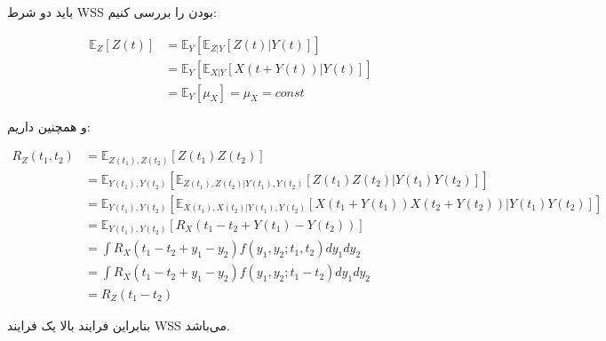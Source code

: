 
باید دو شرط WSS بودن را بررسی کنیم:

$$
\begin{aligned}
	{\mathbb{E}_Z}\left[ {Z\left( t \right)} \right] & = {\mathbb{E}_Y}\left[ {{\mathbb{E}_{Z|Y}}\left[ {Z\left( t \right)|Y\left( t \right)} \right]} \right]\\
	&‌= {\mathbb{E}_Y}\left[ {{\mathbb{E}_{X|Y}}\left[ {X\left( {t + Y\left( t \right)} \right)|Y\left( t \right)} \right]} \right]\\
	& = {\mathbb{E}_Y}\left[ {{\mu _X}} \right] = {\mu _X} = const
\end{aligned}
$$

و همچنین داریم:

$$
\begin{aligned}
	{R_Z}\left( {{t_1},{t_2}} \right) & = {\mathbb{E}_{Z\left( {{t_1}} \right),Z\left( {{t_2}} \right)}}\left[ {Z\left( {{t_1}} \right)Z\left( {{t_2}} \right)} \right] \\
	& = {\mathbb{E}_{Y\left( {{t_1}} \right),Y\left( {{t_2}} \right)}}\left[ {{\mathbb{E}_{Z\left( {{t_1}} \right),Z\left( {{t_2}} \right)|Y\left( {{t_1}} \right),Y\left( {{t_2}} \right)}}\left[ {Z\left( {{t_1}} \right)Z\left( {{t_2}} \right)|Y\left( {{t_1}} \right)Y\left( {{t_2}} \right)} \right]} \right] \\
	&‌= {\mathbb{E}_{Y\left( {{t_1}} \right),Y\left( {{t_2}} \right)}}\left[ {{\mathbb{E}_{X\left( {{t_1}} \right),X\left( {{t_2}} \right)|Y\left( {{t_1}} \right),Y\left( {{t_2}} \right)}}\left[ {X\left( {{t_1} + Y\left( {{t_1}} \right)} \right)X\left( {{t_2} + Y\left( {{t_2}} \right)} \right)|Y\left( {{t_1}} \right)Y\left( {{t_2}} \right)} \right]} \right]\\
	& = {\mathbb{E}_{Y\left( {{t_1}} \right),Y\left( {{t_2}} \right)}}\left[ {{R_X}\left( {{t_1} - {t_2} + Y\left( {{t_1}} \right) - Y\left( {{t_2}} \right)} \right)} \right]\\
	& = \int {{R_X}\left( {{t_1} - {t_2} + {y_1} - {y_2}} \right)f\left( {{y_1},{y_2};{t_1},{t_2}} \right)d{y_1}d{y_2}} \\
	&‌= \int {{R_X}\left( {{t_1} - {t_2} + {y_1} - {y_2}} \right)f\left( {{y_1},{y_2};{t_1} - {t_2}} \right)d{y_1}d{y_2}} \\
	&‌= {R_Z}\left( {{t_1} - {t_2}} \right)
\end{aligned}
$$


بنابراین فرایند بالا یک فرایند WSS می‌باشد.